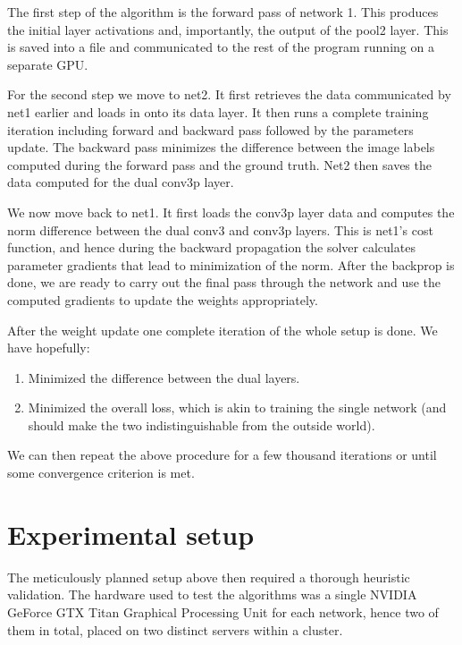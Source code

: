 \documentclass[a4paper, 12pt]{article}
\numberwithin{equation}{section}
\begin{document}
	The first step of the algorithm is the forward pass of network 1. This produces the initial layer activations and, importantly, the output of the pool2 layer. This is saved into a file and communicated to the rest of the program running on a separate GPU.

	For the second step we move to net2. It first retrieves the data communicated by net1 earlier and loads in onto its data layer. It then runs a complete training iteration including forward and backward pass followed by the parameters update. The backward pass minimizes the difference between the image labels computed during the forward pass and the ground truth. Net2 then saves the data computed for the dual conv3p layer.

	We now move back to net1. It first loads the conv3p layer data and computes the norm difference between the dual conv3 and conv3p layers. This is net1's cost function, and hence during the backward propagation the solver calculates parameter gradients that lead to minimization of the norm. After the backprop is done, we are ready to carry out the final pass through the network and use the computed gradients to update the weights appropriately.

	After the weight update one complete iteration of the whole setup is done. We have hopefully:

	\begin{enumerate}
		\item Minimized the difference between the dual layers.
		\item Minimized the overall loss, which is akin to training the single network (and should make the two indistinguishable from the outside world).
	\end{enumerate}

	We can then repeat the above procedure for a few thousand iterations or until some convergence criterion is met.

	\section{Experimental setup}

	The meticulously planned setup above then required a thorough heuristic validation. The hardware used to test the algorithms was a single NVIDIA GeForce GTX Titan Graphical Processing Unit for each network, hence two of them in total, placed on two distinct servers within a cluster.
\end{document}
